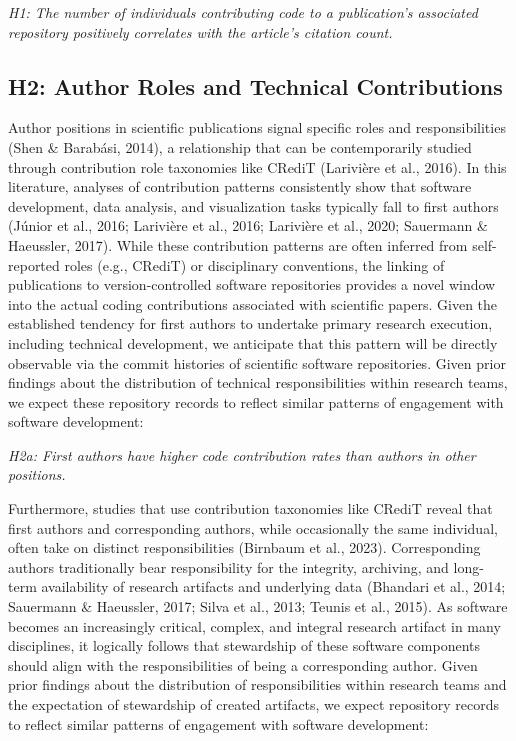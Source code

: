 \documentclass[
  number,
  3p,
  onecolumn]{elsarticle}
\begin{document}
\emph{H1: The number of individuals contributing code to a publication's
associated repository positively correlates with the article's citation
count.}

\subsection{H2: Author Roles and Technical
Contributions}\label{h2-author-roles-and-technical-contributions}

Author positions in scientific publications signal specific roles and
responsibilities (Shen \& Barabási, 2014), a relationship that can be
contemporarily studied through contribution role taxonomies like CRediT
(Larivière et al., 2016). In this literature, analyses of contribution
patterns consistently show that software development, data analysis, and
visualization tasks typically fall to first authors (Júnior et al.,
2016; Larivière et al., 2016; Larivière et al., 2020; Sauermann \&
Haeussler, 2017). While these contribution patterns are often inferred
from self-reported roles (e.g., CRediT) or disciplinary conventions, the
linking of publications to version-controlled software repositories
provides a novel window into the actual coding contributions associated
with scientific papers. Given the established tendency for first authors
to undertake primary research execution, including technical
development, we anticipate that this pattern will be directly observable
via the commit histories of scientific software repositories. Given
prior findings about the distribution of technical responsibilities
within research teams, we expect these repository records to reflect
similar patterns of engagement with software development:

\emph{H2a: First authors have higher code contribution rates than
authors in other positions.}

Furthermore, studies that use contribution taxonomies like CRediT reveal
that first authors and corresponding authors, while occasionally the
same individual, often take on distinct responsibilities (Birnbaum et
al., 2023). Corresponding authors traditionally bear responsibility for
the integrity, archiving, and long-term availability of research
artifacts and underlying data (Bhandari et al., 2014; Sauermann \&
Haeussler, 2017; Silva et al., 2013; Teunis et al., 2015). As software
becomes an increasingly critical, complex, and integral research
artifact in many disciplines, it logically follows that stewardship of
these software components should align with the responsibilities of
being a corresponding author. Given prior findings about the
distribution of responsibilities within research teams and the
expectation of stewardship of created artifacts, we expect repository
records to reflect similar patterns of engagement with software
development:
\end{document}
